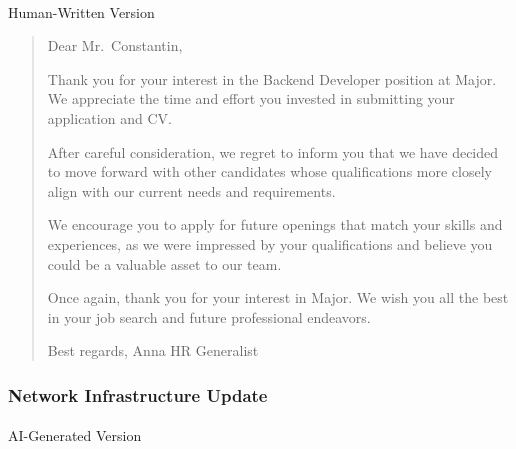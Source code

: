 \documentclass[
]{article}
\makeatletter
\let\oldparagraph\paragraph
\renewcommand{\paragraph}{
    \@ifstar
      \xxxParagraphStar
      \xxxParagraphNoStar
  }
\newcommand{\xxxParagraphStar}[1]{\oldparagraph*{#1}\mbox{}}
\newcommand{\xxxParagraphNoStar}[1]{\oldparagraph{#1}\mbox{}}
\makeatother
\begin{document}
\paragraph{Human-Written Version}\label{human-written-version-2}

\begin{quote}
Dear Mr.~Constantin,

Thank you for your interest in the Backend Developer position at Major.
We appreciate the time and effort you invested in submitting your
application and CV.

After careful consideration, we regret to inform you that we have
decided to move forward with other candidates whose qualifications more
closely align with our current needs and requirements.

We encourage you to apply for future openings that match your skills and
experiences, as we were impressed by your qualifications and believe you
could be a valuable asset to our team.

Once again, thank you for your interest in Major. We wish you all the
best in your job search and future professional endeavors.

Best regards, Anna HR Generalist
\end{quote}

\subsubsection{Network Infrastructure
Update}\label{network-infrastructure-update}

\paragraph{AI-Generated Version}\label{ai-generated-version-3}
\end{document}
